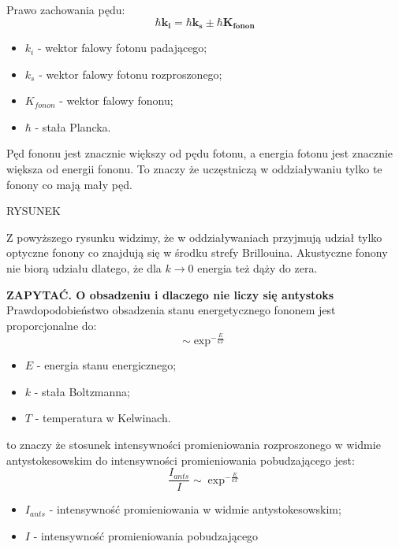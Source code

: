 Prawo zachowania pędu:
\begin{equation}
	\hbar \mathbf{k_{i}} = \hbar \mathbf{k_{s}} \pm \hbar \mathbf{K_{fonon}}
\end{equation}
\begin{itemize}	
	\item $k_{i}$ - wektor falowy fotonu padającego;
	\item $k_{s}$ - wektor falowy fotonu rozproszonego;
	\item $K_{fonon}$ - wektor falowy fononu;
	\item $\hbar$ - stała Plancka.
\end{itemize}

Pęd fononu jest znacznie większy od pędu fotonu, a energia fotonu jest 
znacznie większa od energii fononu. To znaczy że uczęstniczą w oddziaływaniu tylko te 
fonony co mają mały pęd.

RYSUNEK

Z powyższego rysunku widzimy, że w oddziaływaniach przyjmują udział tylko optyczne fonony co znajdują się w środku strefy Brillouina. Akustyczne fonony nie biorą udziału dlatego, że dla $k \rightarrow 0$ energia też dąży do zera.

\vspace{1cm}
\textbf{ZAPYTAĆ. O obsadzeniu i dlaczego nie liczy się antystoks} \\ 
Prawdopodobieństwo obsadzenia stanu energetycznego fononem jest proporcjonalne do:
\begin{equation}
	\sim \exp^{-\frac{E}{kT}} 
\end{equation}
\begin{itemize}
	\item{$E$ - energia stanu energicznego};
	\item{$k$ - stała Boltzmanna};
	\item{$T$ - temperatura w Kelwinach}.
\end{itemize}
to znaczy że stosunek intensywności promieniowania rozproszonego w widmie antystokesowskim
do intensywności promieniowania pobudzającego jest:
\begin{equation}
	\frac{I_{ants}}{I} \sim \exp^{-\frac{E}{kT}}
\end{equation}
\begin{itemize}
	\item{$I_{ants}$ - intensywność promieniowania w widmie antystokesowskim};
	\item{$I$ - intensywność promieniowania pobudzającego}
\end{itemize}

